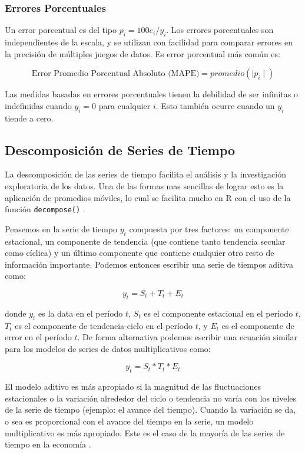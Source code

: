 \subsubsection{Errores Porcentuales}
Un error porcentual es del tipo $p_i = 100 e_i / y_i$. Los errores porcentuales son independientes de la escala, y se utilizan con facilidad para comparar errores en la precisión de múltiples juegos de datos. Es error porcentual más común es:

\[ \text{Error Promedio Porcentual Absoluto (MAPE)} = promedio(\mid p_i \mid) \]

Las medidas basadas en errores porcentuales tienen la debilidad de ser infinitas o indefinidas cuando $y_i = 0$ para cualquier $i$. Esto también ocurre cuando un $y_i$ tiende a cero. 

\subsection{Descomposición de Series de Tiempo}
La descomposición de las series de tiempo facilita el análisis y la investigación exploratoria de los datos. Una de las formas mas sencillas de lograr esto es la aplicación de promedios móviles, lo cual se facilita mucho en R con el uso de la función \texttt{decompose()} \cite{daroczi}.

Pensemos en la serie de tiempo $y_t$ compuesta por tres factores: un componente estacional, un componente de tendencia (que contiene tanto tendencia secular como cíclica) y un último componente que contiene cualquier otro resto de información importante. Podemos entonces escribir una serie de tiempos aditiva como:

\[ y_t = S_t + T_t + E_t \]

donde $y_t$ es la data en el período $t$, $S_t$ es el componente estacional en el período $t$, $T_t$ es el componente de tendencia-ciclo en el período $t$, y $E_t$ es el componente de error en el período $t$. De forma alternativa podemos escribir una ecuación similar para los modelos de series de datos multiplicativos como:

\[ y_t = S_t * T_t * E_t  \]

El modelo aditivo es más apropiado si la magnitud de las fluctuaciones estacionales o la variación alrededor del ciclo o tendencia no varía con los niveles de la serie de tiempo (ejemplo: el avance del tiempo). Cuando la variación se da, o sea es proporcional con el avance del tiempo en la serie, un modelo multiplicativo es más apropiado. Este es el caso de la mayoría de las series de tiempo en la economía \cite{hyndman}.

